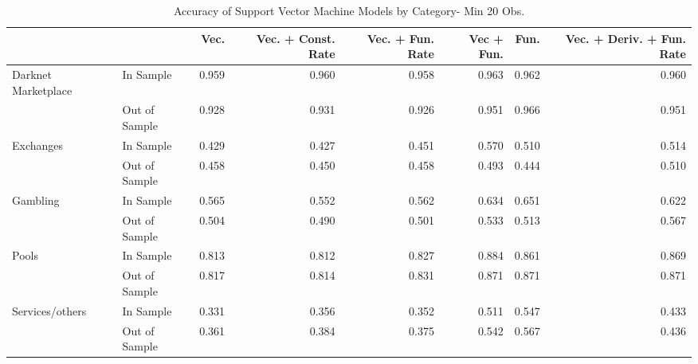 \begin{table}[ht]
\centering
\begin{tabular}{llrrrrrr}
  \hline
 &  & Vec. & Vec. + Const. Rate & Vec. + Fun. Rate & Vec + Fun. & Fun. & Vec. + Deriv. + Fun. Rate \\ 
  \hline
Darknet Marketplace & In Sample & 0.959 & 0.960 & 0.958 & 0.963 & 0.962 & 0.960 \\ 
   & Out of Sample & 0.928 & 0.931 & 0.926 & 0.951 & 0.966 & 0.951 \\ 
  Exchanges & In Sample & 0.429 & 0.427 & 0.451 & 0.570 & 0.510 & 0.514 \\ 
   & Out of Sample & 0.458 & 0.450 & 0.458 & 0.493 & 0.444 & 0.510 \\ 
  Gambling & In Sample & 0.565 & 0.552 & 0.562 & 0.634 & 0.651 & 0.622 \\ 
   & Out of Sample & 0.504 & 0.490 & 0.501 & 0.533 & 0.513 & 0.567 \\ 
  Pools & In Sample & 0.813 & 0.812 & 0.827 & 0.884 & 0.861 & 0.869 \\ 
   & Out of Sample & 0.817 & 0.814 & 0.831 & 0.871 & 0.871 & 0.871 \\ 
  Services/others & In Sample & 0.331 & 0.356 & 0.352 & 0.511 & 0.547 & 0.433 \\ 
   & Out of Sample & 0.361 & 0.384 & 0.375 & 0.542 & 0.567 & 0.436 \\ 
   \hline
\end{tabular}
\caption{Accuracy of Support Vector Machine Models by Category- Min 20 Obs.} 
\label{svm_20obs_acc_cat}
\end{table}
